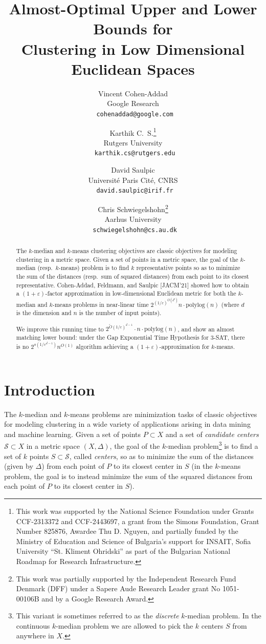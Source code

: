 \documentclass[11pt]{article}
\title{\textbf{Almost-Optimal Upper and Lower Bounds for\\ Clustering in Low Dimensional Euclidean Spaces}}
\author{}
\author{Vincent Cohen-Addad\\ Google Research\\ \texttt{\color{pink!70!red} cohenaddad@google.com}\and Karthik C.\ S.\footnote{This work was supported by the National Science Foundation under Grants CCF-2313372 and CCF-2443697, a grant from the Simons Foundation, Grant Number 825876, Awardee Thu D. Nguyen, and partially funded by the Ministry of Education and Science of Bulgaria's support for INSAIT, Sofia University ``St. Kliment Ohridski'' as part of the Bulgarian National Roadmap for Research Infrastructure.}\\ Rutgers University\\\vspace{0.1in} \texttt{\color{pink!70!red} karthik.cs@rutgers.edu}\and David Saulpic\\ Université Paris Cité, CNRS\\ \texttt{\color{pink!70!red} david.saulpic@irif.fr}\and Chris Schwiegelshohn\footnote{This work was partially supported by the Independent Research Fund Denmark (DFF) under a Sapere Aude Research Leader grant No 1051-00106B and by a Google Research Award.}\\ Aarhus University\\ \texttt{\color{pink!70!red} schwiegelshohn@cs.au.dk} }
\date{}
\newcommand{\eps}{\varepsilon}
\newcommand{\polylog}{\mathrm{ polylog}}
\renewcommand{\tilde}{\widetilde}
\newcommand{\calS}{\mathcal {S}}
\begin{document}
\maketitle
\begin{abstract}
The $k$-median and $k$-means clustering objectives are classic objectives for
modeling clustering in a metric space. Given a set of points in a metric
space, the goal of the $k$-median (resp.\ $k$-means) problem is to find $k$ representative points so as to minimize the sum of the distances (resp.\ sum of squared distances) from each point to its closest representative.
Cohen-Addad, Feldmann, and Saulpic [JACM'21] showed how to obtain a $(1+\eps)$-factor approximation in low-dimensional Euclidean metric for
both the $k$-median and $k$-means problems in near-linear time $2^{(1/\eps)^{O(d^2)}} n \cdot \polylog(n)$ (where $d$ is the dimension and $n$ is the number of input points).\vspace{0.15cm}

We improve this running time to $2^{\tilde O(1/\eps)^{d-1}} \cdot n \cdot \polylog(n)$, and show an almost matching lower bound: under the Gap Exponential Time Hypothesis for 3-SAT, there is no $2^{{o}(1/\eps^{d-1})} n^{O(1)}$ algorithm
achieving a $(1+\eps)$-approximation for $k$-means.
\end{abstract}
\clearpage

\section{Introduction}
The $k$-median and $k$-means problems are minimization tasks of classic objectives for modeling
clustering in a wide variety of applications arising in data mining and
machine learning. Given a set of points $P\subset X$  and a set of \emph{candidate centers} $\calS \subset X$ in a metric space $(X, \Delta)$,
the goal of the $k$-median problem\footnote{This variant is sometimes referred to as the \emph{discrete} $k$-median problem. In the continuous $k$-median problem we are allowed to pick the $k$ centers $S$ from anywhere in $X$. } is to find a set of $k$ points $S \subset \calS$, called \emph{centers}, so as
to minimize the sum of the distances (given by $\Delta$) from each point of $P$ to its closest
center in $S$ (in the $k$-means problem, the goal is to instead minimize the sum of the squared distances from each point of $P$ to its closest center in $S$).
\end{document}
